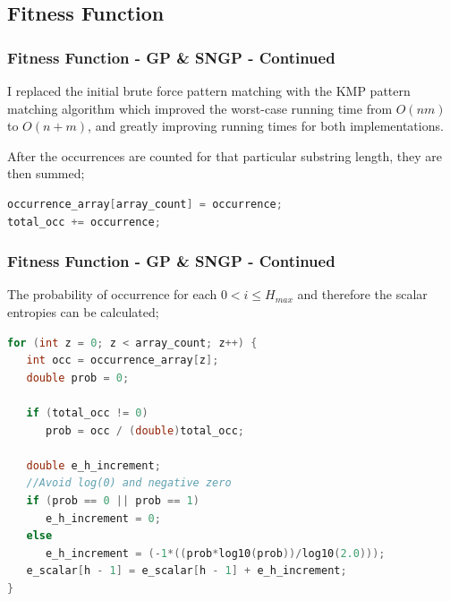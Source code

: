 \documentclass{beamer}
\begin{document}
\subsection{Fitness Function}
\begin{frame}[fragile]
\frametitle{Fitness Function - GP \& SNGP - Continued}
I replaced the initial brute force pattern matching with the KMP pattern matching algorithm which improved the worst-case running time from $O(nm)$ to $O(n + m)$, and greatly improving running times for both implementations.\newline

After the occurrences are counted for that particular substring length, they are then summed;\newline

\begin{lstlisting}[language=C, basicstyle=\scriptsize]
occurrence_array[array_count] = occurrence;
total_occ += occurrence;
\end{lstlisting}
\end{frame}

\begin{frame}[fragile]
\frametitle{Fitness Function - GP \& SNGP - Continued}
The probability of occurrence for each $0 < i \leq H_{max}$ and therefore the scalar entropies can be calculated;\newline

\begin{lstlisting}[language=C, basicstyle=\scriptsize]
for (int z = 0; z < array_count; z++) {
   int occ = occurrence_array[z];
   double prob = 0;

   if (total_occ != 0) 
      prob = occ / (double)total_occ;

   double e_h_increment;
   //Avoid log(0) and negative zero
   if (prob == 0 || prob == 1) 
      e_h_increment = 0;
   else
      e_h_increment = (-1*((prob*log10(prob))/log10(2.0)));
   e_scalar[h - 1] = e_scalar[h - 1] + e_h_increment;
}
\end{lstlisting}
\end{frame}
\end{document}
